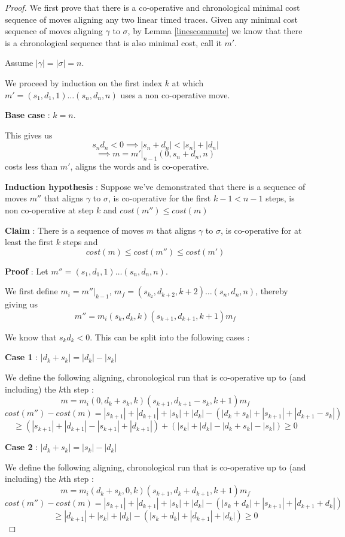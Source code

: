 \documentclass{article}
\newcounter{cases}
\theoremstyle{Definition}
\theoremstyle{definition}
\begin{document}
		\begin{proof}
			We first prove that there is a co-operative and chronological minimal cost sequence of moves aligning any two linear timed traces. 
			Given any minimal cost sequence of moves aligning $\gamma$ to $\sigma$, by Lemma \ref{linescommute} we know that there is a chronological sequence that is also minimal cost, call it $m'$. 
			
	Assume $|\gamma| = |\sigma| = n$. 
	
	We proceed by induction on the first index $k$ at which $m' = (s_1, d_1, 1)\dots(s_n, d_n, n)$ uses a non co-operative move. 
	
	\textbf{Base case} : $k = n$.
	
	This gives us $$s_n d_n < 0 \implies |s_n + d_n| < |s_n| + |d_n|$$ 
	$$\implies m = m'|_{n-1}(0, s_n + d_n, n)$$ costs less than $m'$, aligns the words and is co-operative. 
	
	\textbf{Induction hypothesis} : Suppose we've demonstrated that there is a sequence of moves $m''$ that aligns $\gamma$ to $\sigma$, is co-operative for the first $k-1 < n-1$ steps, is non co-operative at step $k$ and $cost(m'') \leq cost(m)$
	
	\textbf{Claim} : There is a sequence of moves $m$ that aligns $\gamma$ to $\sigma$, is co-operative for at least the first $k$ steps and $$cost(m) \leq cost(m'') \leq cost(m')$$
	
	\textbf{Proof} : Let $m'' = (s_1, d_1, 1)\dots(s_n, d_n, n)$. 
	
	We first define $m_i = m''|_{k-1}$, $m_f = (s_{k_2}, d_{k+2}, k+2)\dots (s_n, d_n, n)$, thereby giving us $$m'' = m_i(s_k, d_k, k)(s_{k+1}, d_{k+1}, k+1)m_f$$
	
	We know that $s_kd_k < 0$. 
	This can be split into the following cases : 
	
	\textbf{Case 1} : $|d_k + s_k| = |d_k| - |s_k|$
	
	We define the following aligning, chronological run that is co-operative up to (and including) the $k$th step : 
	$$m = m_i( 0, d_k + s_k, k)( s_{k+1}, d_{k+1} - s_k, k+1)m_f$$
	$$cost(m'') - cost(m) = |s_{k+1}| + |d_{k+1}| + |s_k| + |d_k| - ( | d_k + s_k| + | s_{k+1}| + | d_{k+1} - s_k |) $$ $$\geq (|s_{k+1}| + |d_{k+1}|  - |s_{k+1}| + | d_{k+1}|  )+ (  |s_k| + |d_k|  -| d_k + s_k|  -|s_k |)   \geq 0$$
	
	\textbf{Case 2} : $|d_k + s_k| = |s_k| - |d_k|$
	
	We define the following aligning, chronological run that is co-operative up to (and including) the $k$th step : 
	$$m = m_i( d_k + s_k, 0, k)( s_{k+1}, d_k + d_{k+1}, k+1)m_f$$
	$$cost(m'') - cost(m) = |s_{k+1}| + |d_{k+1}| + |s_k| + |d_k| - (|s_k + d_k | + | s_{k+1}| + | d_{k+1} + d_k |) $$
	$$\geq |d_{k+1}| + |s_k| + |d_k| - (|s_k + d_k | + | d_{k+1}| + |d_k |) \geq 0$$
	

\end{proof}
\end{document}
